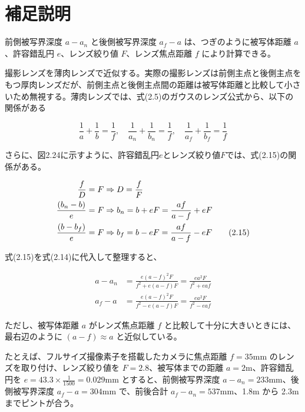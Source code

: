 \documentclass{jsarticle}
\begin{document}
\section*{補足説明}

前側被写界深度 $a - a_n$ と後側被写界深度 $a_f - a$ は、つぎのように被写体距離 $a$、許容錯乱円 $e$、レンズ絞り値 $F$、レンズ焦点距離 $f$ により計算できる。

撮影レンズを薄肉レンズで近似する。実際の撮影レンズは前側主点と後側主点をもつ厚肉レンズだが、前側主点と後側主点間の距離は被写体距離と比較して小さいため無視する。薄肉レンズでは、式(2.5)のガウスのレンズ公式から、以下の関係がある

\begin{equation}
\frac{1}{a} + \frac{1}{b} = \frac{1}{f}, \quad
\frac{1}{a_n} + \frac{1}{b_n} = \frac{1}{f}, \quad
\frac{1}{a_f} + \frac{1}{b_f} = \frac{1}{f}
\tag{2.14}
\end{equation}

さらに、図2.24に示すように、許容錯乱円$e$とレンズ絞り値$F$では、式(2.15)の関係がある。


\begin{align}
\frac{f}{D} = F &\Rightarrow D = \frac{f}{F} \notag \\
\frac{(b_n - b)}{e} = F &\Rightarrow b_n = b + eF = \frac{af}{a - f} + eF \notag \\
\frac{(b - b_f)}{e} = F &\Rightarrow b_f = b - eF = \frac{af}{a - f} - eF
\tag{2.15}
\end{align}

式(2.15)を式(2.14)に代入して整理すると、

\begin{align}
a - a_n &= \frac{e(a - f)^2 F}{f^2 + e(a - f)F} = \frac{ea^2 F}{f^2 + eaf} \tag{2.16} \\
a_f - a &= \frac{e(a - f)^2 F}{f^2 - e(a - f)F} = \frac{ea^2 F}{f^2 - eaf} \tag{2.17}
\end{align}

ただし、被写体距離 $a$ がレンズ焦点距離 $f$ と比較して十分に大きいときには、最右辺のように $(a - f) \approx a$ と近似している。

たとえば、フルサイズ撮像素子を搭載したカメラに焦点距離 $f = 35$mm のレンズを取り付け、レンズ絞り値を $F = 2.8$、被写体までの距離 $a = 2$m、許容錯乱円を $e = 43.3 \times \frac{1}{1500} = 0.029$mm とすると、前側被写界深度 $a - a_n = 233$mm、後側被写界深度 $a_f - a = 304$mm で、前後合計 $a_f - a_n = 537$mm、1.8m から 2.3m までピントが合う。
\end{document}
